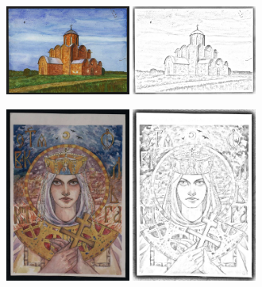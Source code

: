 \begin{figure}
     \centering
     \begin{subfigure}[b]{0.5\textwidth}
         \centering
         \includegraphics[width=0.45\textwidth]{images/style_augments/1998_14-17_0101_RUS_R_C.jpg}\hfil
         \includegraphics[width=0.45\textwidth]{images/style_augments/1998_14-17_0101_RUS_R_C_pencil_gray.jpg}
         \caption{}
     \end{subfigure}
     \hfil
     \begin{subfigure}[b]{0.5\textwidth}
         \centering
         \includegraphics[width=0.45\textwidth]{images/style_augments/2019_14-17_0193_RUS_R_C.jpg}\hfil
         \includegraphics[width=0.45\textwidth]{images/style_augments/2019_14-17_0193_RUS_R_C_pencil_gray.jpg}

\end{subfigure}
\end{figure}
